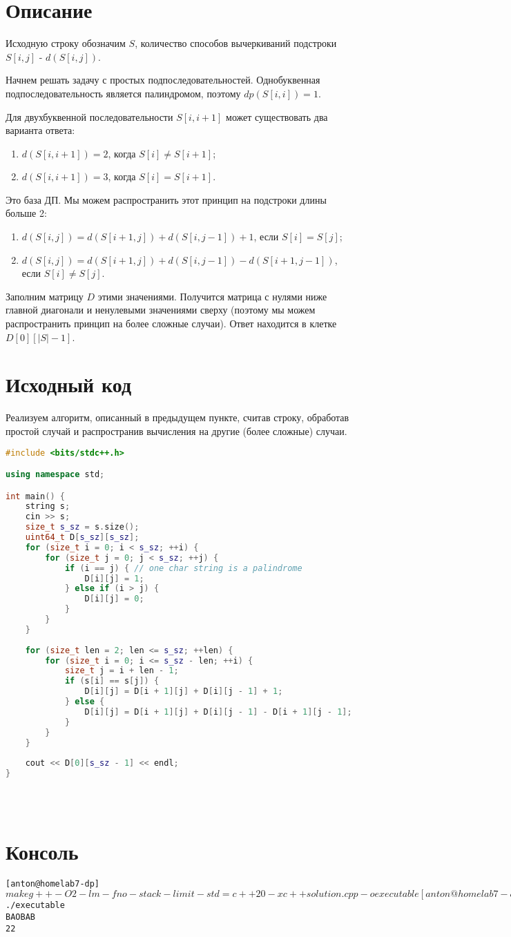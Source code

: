 \section{Описание}
Исходную строку обозначим $S$, количество способов вычеркиваний подстроки $S[i, j]$ - $d(S[i, j])$.

Начнем решать задачу с простых подпоследовательностей. Однобуквенная подпоследовательность является палиндромом, поэтому $dp(S[i, i]) = 1$.

Для двухбуквенной последовательности $S[i, i + 1]$ может существовать два варианта ответа: 
\begin{enumerate}
	\item $d(S[i, i+1]) = 2$, когда $S[i] \neq S[i + 1]$;
	\item $d(S[i, i+1]) = 3$, когда $S[i] = S[i + 1]$.
\end{enumerate}

Это база ДП. Мы можем распространить этот принцип на подстроки длины больше 2:
\begin{enumerate}
	\item $d(S[i, j]) = d(S[i + 1, j]) + d(S[i, j -1]) + 1$, если $S[i] = S[j]$;
	\item $d(S[i, j]) = d(S[i + 1, j]) + d(S[i, j -1]) - d(S[i + 1, j - 1])$, если $S[i] \neq S[j]$.
\end{enumerate}

Заполним матрицу $D$ этими значениями. Получится матрица с нулями ниже главной диагонали и ненулевыми значениями сверху (поэтому мы можем распространить принцип на более сложные случаи). Ответ находится в клетке $D[0][|S|-1]$.
\pagebreak

\section{Исходный код}
Реализуем алгоритм, описанный в предыдущем пункте, считав строку, обработав простой случай  и распространив вычисления на другие (более сложные) случаи.

\begin{lstlisting}[language=C++]
#include <bits/stdc++.h>

using namespace std;

int main() {
	string s;
	cin >> s;
	size_t s_sz = s.size();
	uint64_t D[s_sz][s_sz];
	for (size_t i = 0; i < s_sz; ++i) {
		for (size_t j = 0; j < s_sz; ++j) {
			if (i == j) { // one char string is a palindrome
				D[i][j] = 1;
			} else if (i > j) {
				D[i][j] = 0;
			}
		}
	}
	
	for (size_t len = 2; len <= s_sz; ++len) {
		for (size_t i = 0; i <= s_sz - len; ++i) {
			size_t j = i + len - 1;
			if (s[i] == s[j]) {
				D[i][j] = D[i + 1][j] + D[i][j - 1] + 1;
			} else {
				D[i][j] = D[i + 1][j] + D[i][j - 1] - D[i + 1][j - 1];
			}
		}
	} 
	
	cout << D[0][s_sz - 1] << endl;
}

	
	
\end{lstlisting}


\pagebreak

\section{Консоль}
\begin{alltt}
	[anton@home lab7-dp]$ make
	g++ -O2 -lm -fno-stack-limit -std=c++20 -x c++ solution.cpp -o executable
	[anton@home lab7-dp]$ ./executable 
	BAOBAB
	22
	
\end{alltt}
\pagebreak